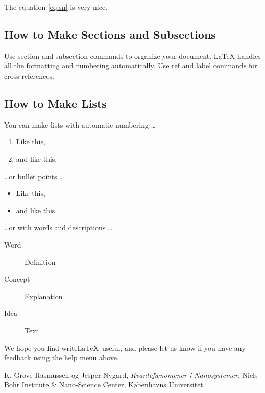 \documentclass[letter]{article}
\begin{document}
The equation \ref{eq:sn} is very nice.

\subsection{How to Make Sections and Subsections}

Use section and subsection commands to organize your document. \LaTeX{} handles all the formatting and numbering automatically. Use ref and label commands for cross-references.

\subsection{How to Make Lists}

You can make lists with automatic numbering \dots

\begin{enumerate}
\item Like this,
\item and like this.
\end{enumerate}
\dots or bullet points \dots
\begin{itemize}
\item Like this,
\item and like this.
\end{itemize}
\dots or with words and descriptions \dots
\begin{description}
\item[Word] Definition
\item[Concept] Explanation
\item[Idea] Text
\end{description}

We hope you find write\LaTeX\ useful, and please let us know if you have any feedback using the help menu above.

\begin{thebibliography}{9}
  K. Grove-Rasmussen og Jesper Nygård,
  \emph{Kvantefænomener i Nanosystemer}.
  Niels Bohr Institute \& Nano-Science Center, Københavns Universitet

\end{thebibliography}
\end{document}
